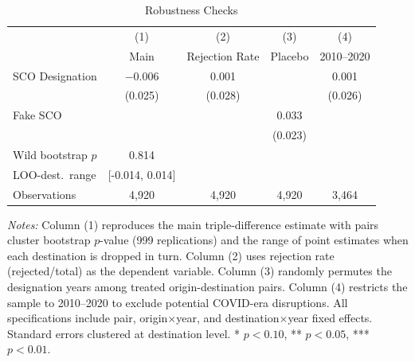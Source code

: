 \begin{table}[H]
\centering
\caption{Robustness Checks}
\begin{threeparttable}
\begin{tabular}{lcccc}
\toprule
 & (1) & (2) & (3) & (4) \\
 & Main & Rejection Rate & Placebo & 2010--2020 \\
\midrule
SCO Designation & $-$0.006 & 0.001 & & 0.001 \\
 & (0.025) & (0.028) & & (0.026) \\[0.3em]
Fake SCO & & & 0.033 & \\
 & & & (0.023) & \\[0.5em]
\midrule
Wild bootstrap $p$ & 0.814 & & & \\
LOO-dest.\ range & [-0.014, 0.014] & & & \\[0.3em]
Observations & 4,920 & 4,920 & 4,920 & 3,464 \\
\bottomrule
\end{tabular}
\begin{tablenotes}[flushleft]
\small
\item \textit{Notes:} Column (1) reproduces the main triple-difference estimate with pairs cluster bootstrap $p$-value (999 replications) and the range of point estimates when each destination is dropped in turn. Column (2) uses rejection rate (rejected/total) as the dependent variable. Column (3) randomly permutes the designation years among treated origin-destination pairs. Column (4) restricts the sample to 2010--2020 to exclude potential COVID-era disruptions. All specifications include pair, origin$\times$year, and destination$\times$year fixed effects. Standard errors clustered at destination level. * $p<0.10$, ** $p<0.05$, *** $p<0.01$.
\end{tablenotes}
\end{threeparttable}
\label{tab:robust}
\end{table}
